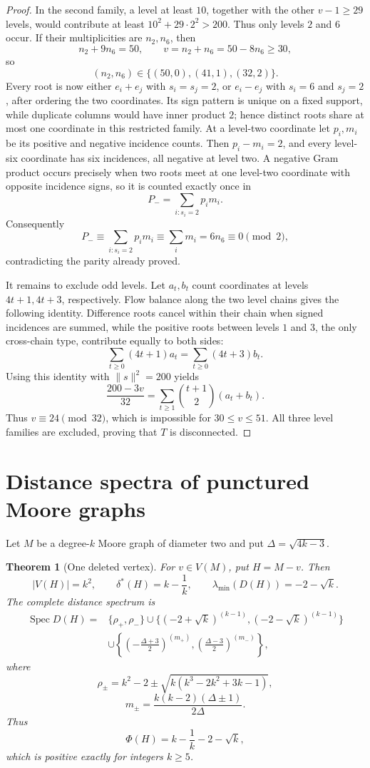 \documentclass[a4paper,10pt,reqno]{amsart}
\theoremstyle{plain}
\newtheorem{theorem}{Theorem}[section]
\theoremstyle{definition}
\theoremstyle{remark}
\newcommand{\Spec}{\operatorname{Spec}}
\begin{document}
\begin{proof}
In the second family, a level at least \(10\), together with the other
\(v-1\ge29\) levels, would contribute at least
\(10^2+29\cdot2^2>200\).  Thus only levels \(2\) and \(6\) occur.  If their
multiplicities are \(n_2,n_6\), then
\[
n_2+9n_6=50,\qquad
v=n_2+n_6=50-8n_6\ge30,
\]
so
\[
(n_2,n_6)\in\{(50,0),(41,1),(32,2)\}.
\]
Every root is now either \(e_i+e_j\) with \(s_i=s_j=2\), or
\(e_i-e_j\) with \(s_i=6\) and \(s_j=2\), after ordering the two coordinates.
Its sign pattern is unique on a fixed support, while duplicate columns would
have inner product \(2\); hence distinct roots share at most one coordinate
in this restricted family.  At a level-two coordinate let \(p_i,m_i\) be its
positive and negative incidence counts.  Then \(p_i-m_i=2\), and every
level-six coordinate has six incidences, all negative at level two.  A
negative Gram product occurs precisely when two roots meet at one level-two
coordinate with opposite incidence signs, so it is counted exactly once in
\[
P_-=\sum_{i:s_i=2}p_im_i.
\]
Consequently
\[
P_-\equiv\sum_{i:s_i=2} p_im_i
\equiv\sum_i m_i
=6n_6
\equiv0\pmod2,
\]
contradicting the parity already proved.

It remains to exclude odd levels.  Let \(a_t,b_t\) count coordinates at
levels \(4t+1,4t+3\), respectively.  Flow balance along the two level chains
gives the following identity.  Difference roots cancel within their chain
when signed incidences are summed, while the positive roots between levels
\(1\) and \(3\), the only cross-chain type, contribute equally to both sides:
\[
\sum_{t\ge0}(4t+1)a_t
=\sum_{t\ge0}(4t+3)b_t.
\]
Using this identity with \(\lVert s\rVert^2=200\) yields
\[
\frac{200-3v}{32}
=\sum_{t\ge1}\binom{t+1}{2}(a_t+b_t).
\]
Thus \(v\equiv24\pmod {32}\), which is impossible for
\(30\le v\le51\).  All three level families are excluded, proving that \(T\)
is disconnected.
\end{proof}

\section{Distance spectra of punctured Moore graphs}\label{sec:punctures}

Let \(M\) be a degree-\(k\) Moore graph of diameter two and put
\(\Delta=\sqrt{4k-3}\).

\begin{theorem}[One deleted vertex]\label{thm:one-puncture}
For \(v\in V(M)\), put \(H=M-v\).  Then
\[
 |V(H)|=k^2,
 \qquad \delta^*(H)=k-\frac1k,
 \qquad \lambda_{\min}(D(H))=-2-\sqrt{k}.
\]
The complete distance spectrum is
\begin{align*}
\Spec D(H)={}&\{\rho_+,\rho_-\}
 \cup\{(-2+\sqrt{k})^{(k-1)},(-2-\sqrt{k})^{(k-1)}\}\\
&\cup\left\{\left(-\frac{\Delta+3}{2}\right)^{(m_+)},
\left(\frac{\Delta-3}{2}\right)^{(m_-)}\right\},
\end{align*}
where
\[
 \rho_\pm=k^2-2\pm\sqrt{k(k^3-2k^2+3k-1)},
\]
\[
 m_\pm=\frac{k(k-2)(\Delta\pm1)}{2\Delta}.
\]
Thus
\[
 \Phi(H)=k-\frac1k-2-\sqrt{k},
\]
which is positive exactly for integers \(k\ge5\).
\end{theorem}
\end{document}

